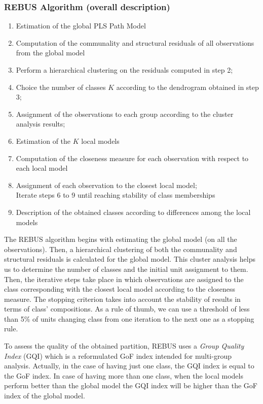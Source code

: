 \documentclass[12pt]{book}\usepackage{graphicx, color}
\begin{document}
\subsubsection*{REBUS Algorithm (overall description)}
\begin{enumerate}
 \item Estimation of the global PLS Path Model
 \item Computation of the communality and structural residuals of all observations from the global model
 \item Perform a hierarchical clustering on the residuals computed in step 2;
 \item Choice the number of classes $K$ according to the dendrogram obtained in step 3;
 \item Assignment of the observations to each group according to the cluster analysis results;
 \item Estimation of the $K$ local models
 \item Computation of the closeness measure for each observation with respect to each local model
 \item Assignment of each observation to the closest local model; \\
 Iterate steps 6 to 9 until reaching stability of class memberships
 \item Description of the obtained classes according to differences among the local models
\end{enumerate}

\vspace{2mm}
The REBUS algorithm begins with estimating the global model (on all the observations). Then, a hierarchical clustering of both the communality and structural residuals is calculated for the global model. This cluster analysis helps us to determine the number of classes and the initial unit assignment to them. Then, the iterative steps take place in which observations are assigned to the class corresponding with the closest local model according to the closeness measure. The stopping criterion takes into account the stability of results in terms of class' compositions. As a rule of thumb, we can use a threshold of less than 5\% of units changing class from one iteration to the next one as a stopping rule.

To assess the quality of the obtained partition, REBUS uses a \textit{Group Quality Index} (GQI) which is a reformulated GoF index intended for multi-group analysis. Actually, in the case of having just one class, the GQI index is equal to the GoF index. In case of having more than one class, when the local models perform better than the global model the GQI index will be higher than the GoF index of the global model.
\end{document}
